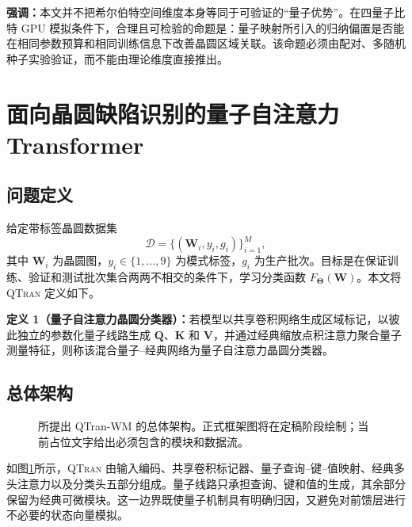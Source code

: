 \documentclass[journal]{IEEEtran}
\newcommand{\qtran}{\textsc{QTran}}
\begin{document}
\textbf{强调：}本文并不把希尔伯特空间维度本身等同于可验证的“量子优势”。在四量子比特 GPU 模拟条件下，合理且可检验的命题是：量子映射所引入的归纳偏置是否能在相同参数预算和相同训练信息下改善晶圆区域关联。该命题必须由配对、多随机种子实验验证，而不能由理论维度直接推出。

\section{面向晶圆缺陷识别的量子自注意力 Transformer}
\label{sec:method}

\subsection{问题定义}

给定带标签晶圆数据集
\begin{equation}
  \mathcal{D}=\{(\bm{W}_i,y_i,g_i)\}_{i=1}^{M},
\end{equation}
其中 $\bm{W}_i$ 为晶圆图，$y_i\in\{1,\ldots,9\}$ 为模式标签，$g_i$ 为生产批次。目标是在保证训练、验证和测试批次集合两两不相交的条件下，学习分类函数 $F_{\bm{\Theta}}(\bm{W})$。本文将 \qtran{} 定义如下。

\textbf{定义 1（量子自注意力晶圆分类器）：}若模型以共享卷积网络生成区域标记，以彼此独立的参数化量子线路生成 $\bm{Q}$、$\bm{K}$ 和 $\bm{V}$，并通过经典缩放点积注意力聚合量子测量特征，则称该混合量子--经典网络为量子自注意力晶圆分类器。

\subsection{总体架构}

\begin{figure}[t]
  \centering
  \caption{所提出 QTran-WM 的总体架构。正式框架图将在定稿阶段绘制；当前占位文字给出必须包含的模块和数据流。}
  \label{fig:framework}
\end{figure}

如图\ref{fig:framework}所示，\qtran{} 由输入编码、共享卷积标记器、量子查询--键--值映射、经典多头注意力以及分类头五部分组成。量子线路只承担查询、键和值的生成，其余部分保留为经典可微模块。这一边界既使量子机制具有明确归因，又避免对前馈层进行不必要的状态向量模拟。
\end{document}
